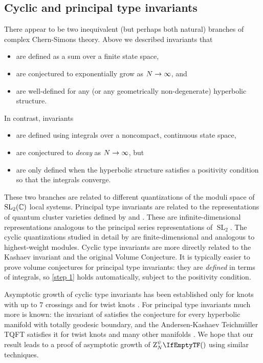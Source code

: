 \documentclass[margincite, leqno]{sl2art}
\numberwithin{equation}{section}
\begin{document}
\subsection{Cyclic and principal type invariants}
\label{sec:negative type}

There appear to be two inequivalent (but perhaps both natural)
branches of complex Chern-Simons theory.
Above we described  invariants
\cite{Baseilhac2004,Bonahon2021,Kashaev2005,McPhailSnyderVolume} that
\begin{itemize}
  \item are defined as a sum over a finite state space,
  \item are conjectured to exponentially grow as \(N \to \infty\), and
  \item are well-defined for any (or any geometrically
    non-degenerate) hyperbolic structure.
\end{itemize}
In contrast,  invariants
\cite{zbMATH06324352,arXiv:1305.4291,arXiv:2508.05120}
\begin{itemize}
  \item are defined using integrals over a noncompact, continuous state space,
  \item are conjectured to \emph{decay} as \(N \to \infty\), but
  \item are only defined when the hyperbolic structure satisfies a
    positivity condition so that the integrals converge.
\end{itemize}
These two branches are related to different quantizations of the moduli space of
\(\operatorname{SL}_2(\mathbb{C})\) local systems.
Principal type invariants are related to the representations of
quantum cluster varieties defined by \citeauthor{zbMATH01607168}
\cite{zbMATH01607168} and \citeauthor{zbMATH05530519}
\cite{zbMATH05530519}.
These are infinite-dimensional representations analogous to the
principal series representations of \(\operatorname{SL}_{2}\).
The cyclic quantizations studied in detail by
\citeauthor{arXiv:2501.02316} \cite{arXiv:2501.02316} are
finite-dimensional and analogous to highest-weight modules.
Cyclic type invariants are more directly related to the Kashaev
invariant and the original Volume Conjecture.
It is typically easier to prove volume conjectures for principal type
invariants:
they are \emph{defined} in terms of integrals, so \cref{step 1} holds
automatically, subject to the positivity condition.

Asymptotic growth of cyclic type invariants has been established
only for knots with up to \(7\) crossings \cite{zbMATH06684922,
Ohtsuki2017, Ohtsuki2018} and for twist knots \cite{Chen2023II}.
For principal type invariants much more is known:
the invariant of \textcite{arXiv:2508.05120} satisfies the conjecture
for every hyperbolic manifold with totally geodesic boundary,
and the Andersen-Kashaev Teichm{\"u}ller TQFT satisfies it for twist
knots \cite{zbMATH07761477} and many other manifolds
\cite{arXiv:2410.10776, arXiv:2512.17437, arXiv:2512.23198}.
We hope that our result leads to a proof of asymptotic growth of
\(\qinv{}\) using similar techniques.
\end{document}
